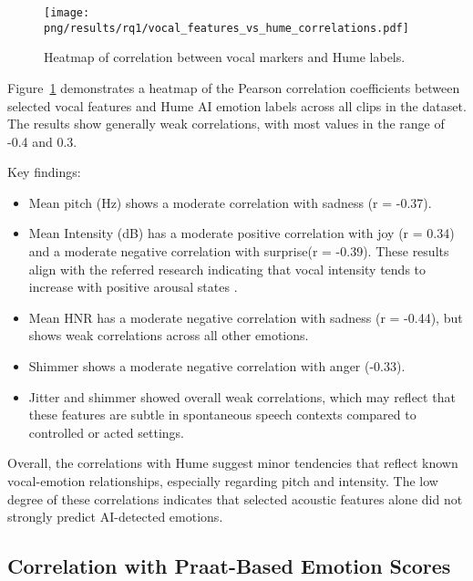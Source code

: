 \begin{figure}[H]
    \centering
    \texttt{[image: png/results/rq1/vocal\_features\_vs\_hume\_correlations.pdf]}
    \caption{Heatmap of correlation between vocal markers and Hume labels.}
    \label{fig:heatmap-voc-hume}
\end{figure}

Figure~\ref{fig:heatmap-voc-hume} demonstrates a heatmap of the Pearson correlation coefficients between selected vocal features and Hume AI emotion labels across all clips in the dataset. The results show generally weak correlations, with most values in the range of -0.4 and 0.3. 

\medskip
Key findings: 
\begin{itemize}
    \item Mean pitch (Hz) shows a moderate correlation with sadness (r = -0.37). 
    \item Mean Intensity (dB) has a moderate positive correlation with joy (r = 0.34) and a moderate negative correlation with surprise(r = -0.39). These results align with the referred research indicating that vocal intensity tends to increase with positive arousal states \autocite{Ekberg2023}. 
    \item Mean HNR has a moderate negative correlation with sadness (r = -0.44), but shows weak correlations across all other emotions.
    \item Shimmer shows a moderate negative correlation with anger (-0.33).
    \item Jitter and shimmer showed overall weak correlations, which may reflect that these features are subtle in spontaneous speech contexts compared to controlled or acted settings.  
\end{itemize}
Overall, the correlations with Hume suggest minor tendencies that reflect known vocal-emotion relationships, especially regarding pitch and intensity. The low degree of these correlations indicates that selected acoustic features alone did not strongly predict AI-detected emotions. 

\subsection{Correlation with Praat-Based Emotion Scores}

